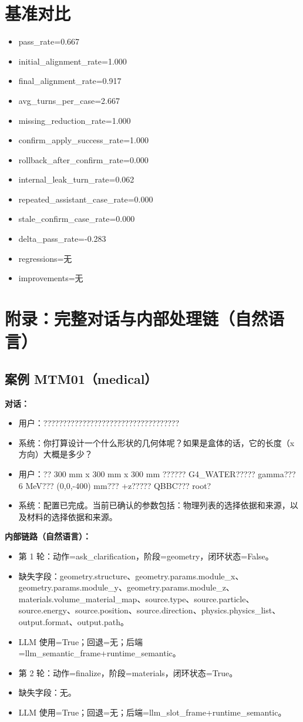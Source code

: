 \documentclass[11pt]{ctexart}
\begin{document}
\section{基准对比}
\begin{itemize}
\item pass\_rate=0.667
\item initial\_alignment\_rate=1.000
\item final\_alignment\_rate=0.917
\item avg\_turns\_per\_case=2.667
\item missing\_reduction\_rate=1.000
\item confirm\_apply\_success\_rate=1.000
\item rollback\_after\_confirm\_rate=0.000
\item internal\_leak\_turn\_rate=0.062
\item repeated\_assistant\_case\_rate=0.000
\item stale\_confirm\_case\_rate=0.000
\item delta\_pass\_rate=-0.283
\item regressions=无
\item improvements=无
\end{itemize}
\appendix
\section{附录：完整对话与内部处理链（自然语言）}
\subsection{案例 MTM01（medical）}
\textbf{对话：}
\begin{itemize}
\item 用户：???????????????????????????????????
\item 系统：你打算设计一个什么形状的几何体呢？如果是盒体的话，它的长度（x方向）大概是多少？
\item 用户：?? 300 mm x 300 mm x 300 mm ?????? G4\_WATER????? gamma??? 6 MeV??? (0,0,-400) mm??? +z????? QBBC??? root?
\item 系统：配置已完成。当前已确认的参数包括：物理列表的选择依据和来源，以及材料的选择依据和来源。
\end{itemize}
\textbf{内部链路（自然语言）：}
\begin{itemize}
\item 第 1 轮：动作=ask\_clarification，阶段=geometry，闭环状态=False。
\item 缺失字段：geometry.structure、geometry.params.module\_x、geometry.params.module\_y、geometry.params.module\_z、materials.volume\_material\_map、source.type、source.particle、source.energy、source.position、source.direction、physics.physics\_list、output.format、output.path。
\item LLM 使用=True；回退=无；后端=llm\_semantic\_frame+runtime\_semantic。
\item 第 2 轮：动作=finalize，阶段=materials，闭环状态=True。
\item 缺失字段：无。
\item LLM 使用=True；回退=无；后端=llm\_slot\_frame+runtime\_semantic。
\end{itemize}
\end{document}

